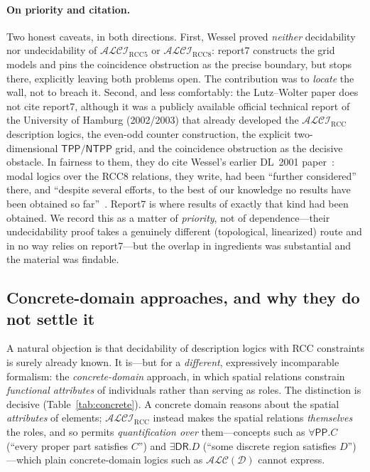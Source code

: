 \documentclass[11pt]{article}
\newcommand{\ALCIRCC}[1]{\mathcal{ALCI}_{\mathrm{RCC#1}}}
\newcommand{\DR}{\mathsf{DR}}
\newcommand{\PP}{\mathsf{PP}}
\newcommand{\ALC}{\ensuremath{\mathcal{ALC}}}
\newcommand{\TPP}{\ensuremath{\mathsf{TPP}}}
\newcommand{\NTPP}{\ensuremath{\mathsf{NTPP}}}
\theoremstyle{plain}
\theoremstyle{definition}
\begin{document}
\paragraph{On priority and citation.} Two honest caveats, in both
directions. First, Wessel proved \emph{neither} decidability nor
undecidability of $\ALCIRCC{5}$ or $\ALCIRCC{8}$: report7 constructs the
grid models and pins the coincidence obstruction as the precise boundary,
but stops there, explicitly leaving both problems open. The contribution
was to \emph{locate} the wall, not to breach it. Second, and less
comfortably: the Lutz--Wolter paper does not cite report7, although it was
a publicly available official technical report of the University of Hamburg
(2002/2003) that already developed the $\ALCIRCC{}$ description logics, the
even-odd counter construction, the explicit two-dimensional $\TPP/\NTPP$
grid, and the coincidence obstruction as the decisive obstacle. In fairness to
them, they do cite Wessel's earlier DL~2001 paper~\cite{Wessel2001}: modal
logics over the RCC8 relations, they write, had been ``further considered''
there, and ``despite several efforts, to the best of our knowledge no results
have been obtained so far''~\cite[p.~2]{LutzWolter2006}. Report7 is where
results of exactly that kind had been obtained. We record
this as a matter of \emph{priority}, not of dependence---their
undecidability proof takes a genuinely different (topological, linearized)
route and in no way relies on report7---but the overlap in ingredients was
substantial and the material was findable.

\subsection{Concrete-domain approaches, and why they do not settle it}
\label{sec:concrete-domains}

A natural objection is that decidability of description logics with RCC
constraints is surely already known. It is---but for a \emph{different},
expressively incomparable formalism: the \emph{concrete-domain} approach,
in which spatial relations constrain \emph{functional attributes} of
individuals rather than serving as roles. The distinction is decisive
(Table~\ref{tab:concrete}). A concrete domain reasons about the spatial
\emph{attributes} of elements; $\ALCIRCC{}$ instead makes the spatial
relations \emph{themselves} the roles, and so permits
\emph{quantification over} them---concepts such as $\forall\PP.C$ (``every
proper part satisfies $C$'') and $\exists\DR.D$ (``some discrete region
satisfies $D$'')---which plain concrete-domain logics such as
$\ALC(\mathcal D)$ cannot express.
\end{document}
